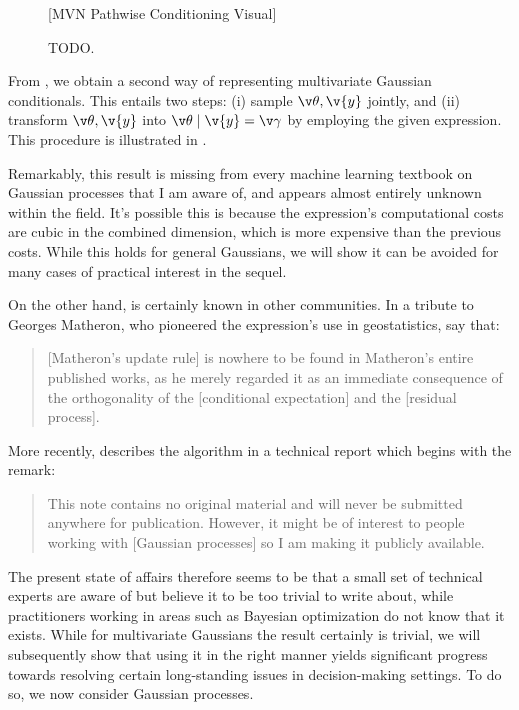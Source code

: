 \documentclass[11pt]{book}
\begin{document}
\begin{figure*}[t]
\vspace*{10ex}
[MVN Pathwise Conditioning Visual]
\vspace*{10ex}
\caption{TODO.}
\label{fig:pw-cond-mvn}
\end{figure*}

From , we obtain a second way of representing multivariate Gaussian conditionals.
This entails two steps: (i) sample $\v\theta,\v{y}$ jointly, and (ii) transform $\v\theta,\v{y}$ into $\v\theta\given\v{y}=\v\gamma$ by employing the given expression.
This procedure is illustrated in .

Remarkably, this result is missing from every machine learning textbook on Gaussian processes that I am aware of, and appears almost entirely unknown within the field.
It's possible this is because the expression's computational costs are cubic in the combined dimension, which is more expensive than the previous costs.
While this holds for general Gaussians, we will show it can be avoided for many cases of practical interest in the sequel.

On the other hand,  is certainly known in other communities.
In a tribute to Georges Matheron, who pioneered the expression's use in geostatistics, \textcite{chiles05} say that:

\begin{quotation}
[Matheron's update rule] is nowhere to be found in Matheron's entire published works, as he merely regarded it as an immediate consequence of the orthogonality of the [conditional expectation] and the [residual process].
\end{quotation}

More recently, \textcite{doucet10} describes the algorithm in a technical report which begins with the remark: 

\begin{quotation}
This note contains no original material and will never be submitted anywhere for publication. However, it might be of interest to people working with [Gaussian processes] so I am making it publicly available.
\end{quotation}

The present state of affairs therefore seems to be that a small set of technical experts are aware of  but believe it to be too trivial to write about, while practitioners working in areas such as Bayesian optimization do not know that it exists.
While for multivariate Gaussians the result certainly is trivial, we will subsequently show that using it in the right manner yields significant progress towards resolving certain long-standing issues in decision-making settings.
To do so, we now consider Gaussian processes.
\end{document}
